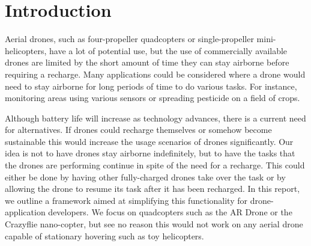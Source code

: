 \section{Introduction}
Aerial drones, such as four-propeller quadcopters or single-propeller mini-helicopters, have a lot of potential use, but the use of commercially available drones are limited by the short amount of time they can stay airborne before requiring a recharge. Many applications could be considered where a drone would need to stay airborne for long periods of time to do various tasks. For instance, monitoring areas using various sensors or spreading pesticide on a field of crops.

Although battery life will increase as technology advances, there is a current need for alternatives. If drones could recharge themselves or somehow become sustainable this would increase the usage scenarios of drones significantly. Our idea is not to have drones stay airborne indefinitely, but to have the tasks that the drones are performing continue in spite of the need for a recharge. This could either be done by having other fully-charged drones take over the task or by allowing the drone to resume its task after it has been recharged. In this report, we outline a framework aimed at simplifying this functionality for drone-application developers. We focus on quadcopters such as the AR Drone or the Crazyflie nano-copter, but see no reason this would not work on any aerial drone capable of stationary hovering such as toy helicopters.